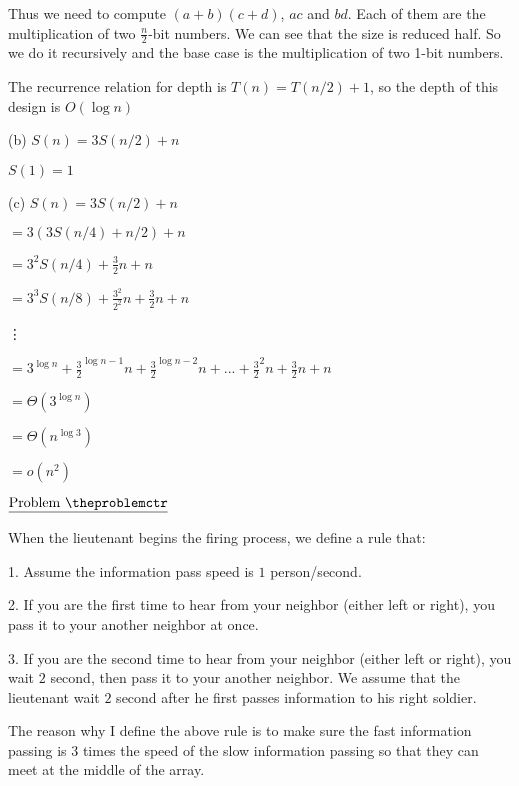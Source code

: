 \documentclass[11pt]{article}
\def\pp{\par\noindent}
\begin{document}
Thus we need to compute $(a+b)(c+d)$, $ac$ and $bd$. Each of them are the multiplication of two $\frac{n}{2}$-bit numbers. We can see that the size is reduced half. So we do it recursively and the base case is the multiplication of two 1-bit numbers.

The recurrence relation for depth is $T(n) = T(n/2) + 1$, so the depth of this design is $O(\log n)$


\bigskip
\bigskip
\noindent
(b) $S(n) = 3S(n/2)+n$
	
	$S(1) = 1$

\bigskip
\bigskip
\noindent
(c) $S(n) = 3S(n/2)+n$

\hspace{1.0 cm}$= 3(3S(n/4)+n/2)+n$

\hspace{1.0 cm}$= 3^2S(n/4)+\frac{3}{2}n+n$ 

\hspace{1.0 cm}$= 3^3S(n/8)+\frac{3^2}{2^2}n+\frac{3}{2}n+n$

\hspace{1.5 cm} \vdots

\hspace{1.0 cm}$= 3^{\log n}+\frac{3}{2}^{\log n-1}n+\frac{3}{2}^{\log n-2}n+...+\frac{3}{2}^{2}n+\frac{3}{2}n+n$

\hspace{1.0 cm}$= \Theta(3^{\log n})$

\hspace{1.0 cm}$= \Theta(n^{\log 3})$

\hspace{1.0 cm}$= o(n^2)$


\vfill
\newpage
\addtocounter{problemctr}{1}
\bigskip
\noindent
$\underline{\rm Problem\ \theproblemctr}$\pp

\noindent
When the lieutenant begins the firing process, we define a rule that:

1. Assume the information pass speed is $1$ person/second.

2. If you are the first time to hear from your neighbor (either left or right), you pass it to your another neighbor at once.

3. If you are the second time to hear from your neighbor (either left or right), you wait $2$ second, then pass it to your another neighbor. We assume that the lieutenant wait $2$ second after he first passes information to his right soldier.

The reason why I define the above rule is to make sure the fast information passing is $3$ times the speed of the slow information passing so that they can meet at the middle of the array.
\end{document}
